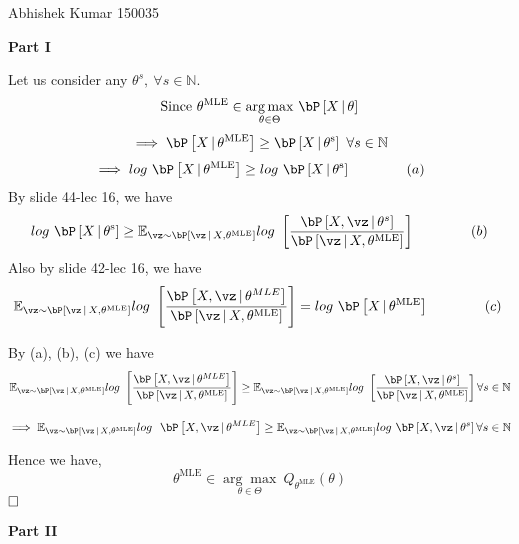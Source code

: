 \documentclass[a4paper,11pt]{article}
\begin{document}
{Abhishek Kumar}      						           		%
{150035}																		%


\begin{mlsolution}


\textbf{Part I}\par
Let us consider any $\theta^s,\ \forall s \in \mathbb{N}$. \\
$$\text{Since } \theta^{\text{MLE}} \in \underset{\theta \in \Theta}{\arg\max}\ \P{X\cond\theta}$$
$$ \implies \P{X\cond\theta^{\text{MLE}}} \geq \P{X\cond\theta^{\text{s}}} \ \forall s\in \mathbb{N}$$
$$ \implies log\  \P{X\cond\theta^{\text{MLE}}} \geq log\  \P{X\cond\theta^{\text{s}}} \qquad\qquad{(a)} $$
By slide 44-lec 16, we have 
$$ log\  \P{X\cond\theta^{\text{s}}} \geq \mathbb{E}_{\vz \sim \P{\vz\cond X, \theta^{\text{MLE}}}} log\  \left[ \frac{\P{X, \vz\cond \theta^{s}}}{\P{\vz\cond X, \theta^{\text{MLE}}}}\right]  \qquad\qquad{(b)}$$
Also by slide 42-lec 16, we have
$$\mathbb{E}_{\vz \sim \P{\vz\cond X, \theta^{\text{MLE}}}} log\  \left[ \frac{\P{X, \vz\cond \theta^{MLE}}}{\P{\vz\cond X, \theta^{\text{MLE}}}}\right]  = log\  \P{X\cond\theta^{\text{MLE}}} \qquad\qquad{(c)}\ $$

By (a), (b), (c) we have
$$\mathbb{E}_{\vz \sim \P{\vz\cond X, \theta^{\text{MLE}}}} log\  \left[ \frac{\P{X, \vz\cond \theta^{MLE}}}{\P{\vz\cond X, \theta^{\text{MLE}}}}\right] \geq \mathbb{E}_{\vz \sim \P{\vz\cond X, \theta^{\text{MLE}}}} log\  \left[ \frac{\P{X, \vz\cond \theta^{s}}}{\P{\vz\cond X, \theta^{\text{MLE}}}}\right]  \forall s \in \mathbb{N}$$

$$\implies \mathbb{E}_{\vz \sim \P{\vz\cond X, \theta^{\text{MLE}}}} log\ \ \P{X, \vz\cond \theta^{MLE}}  \geq \mathbb{E}_{\vz \sim \P{\vz\cond X, \theta^{\text{MLE}}}} log\  \P{X, \vz\cond \theta^{s}} \forall s \in \mathbb{N}$$

Hence we have,
$$\theta^{\text{MLE}} \in \underset{\theta \in \Theta}{\arg\max}\ Q_{\theta^{\text{MLE}}}(\theta)$$ $ \hfill \square $

\textbf{Part II}\par


\end{mlsolution}
\end{document}
